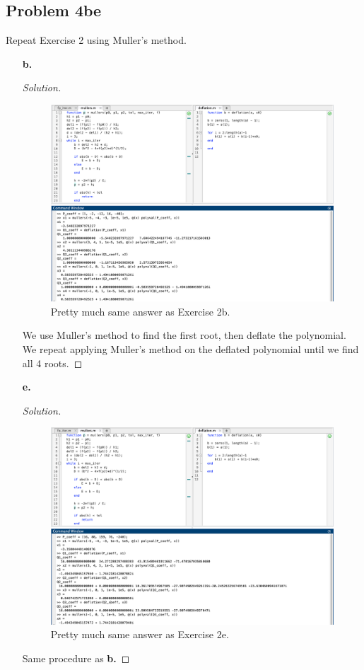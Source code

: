\documentclass{article}
\begin{document}
\subsection*{Problem 4be}
Repeat Exercise 2 using Muller's method.
\begin{enumerate}
    \item[\textbf{b.}]
    \begin{proof}[Solution]\indent
        \begin{figure}[htb!]
            \centering
            \includegraphics[scale=0.25]{2.6.4b.png}
            \caption{Pretty much same answer as Exercise 2b.}
        \end{figure}

        We use Muller's method to find the first root, then deflate the polynomial. 
        We repeat applying Muller's method on the deflated polynomial until we find all 4 roots.
    \end{proof} 

    \item[\textbf{e.}]
    \begin{proof}[Solution]\indent
        \begin{figure}[htb!]
            \centering
            \includegraphics[scale=0.25]{2.6.4e.png}
            \caption{Pretty much same answer as Exercise 2e.}
        \end{figure}
        
        Same procedure as \textbf{b.}
    \end{proof} 
\end{enumerate}
\end{document}
